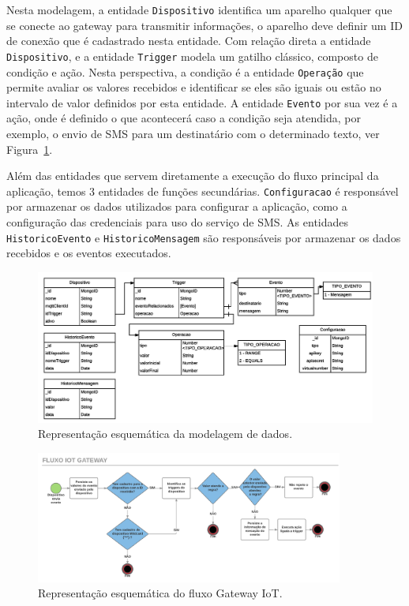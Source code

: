 Nesta modelagem, a entidade \verb|Dispositivo| identifica um aparelho qualquer que se conecte ao gateway para transmitir informações, o aparelho deve definir um ID de conexão que é cadastrado nesta entidade. Com relação direta a entidade \verb|Dispositivo|, e a entidade \verb|Trigger| modela um gatilho clássico, composto de condição e ação. Nesta perspectiva, a condição é a entidade \verb|Operação| que permite avaliar os valores recebidos e identificar se eles são iguais ou estão no intervalo de valor definidos por esta entidade. A entidade \verb|Evento| por sua vez é a ação, onde é definido o que acontecerá caso a condição seja atendida, por exemplo, o envio de SMS para um destinatário com o determinado texto, ver Figura~\ref{fig:modeloDeDados}.

Além das entidades que servem diretamente a execução do fluxo principal da aplicação, temos 3 entidades de funções secundárias. \verb|Configuracao| é responsável por armazenar os dados utilizados para configurar a aplicação, como a configuração das credenciais para uso do serviço de SMS. As entidades \verb|HistoricoEvento| e \verb|HistoricoMensagem| são responsáveis por armazenar os dados recebidos e os eventos executados.

\begin{figure}[h!]
	\begin{center}
		\includegraphics[width=1.085\textwidth]{./img/modelo-de-dados}
		\caption{Representação esquemática da modelagem de dados.}
		\label{fig:modeloDeDados}
	\end{center}
\end{figure}

\begin{figure}[h!]
		\begin{center}
		\includegraphics[width=0.9\textwidth]{./img/fluxograma}
		\caption{Representação esquemática do fluxo Gateway IoT.}
		\label{fig:fluxograma}
	\end{center}
\end{figure}

